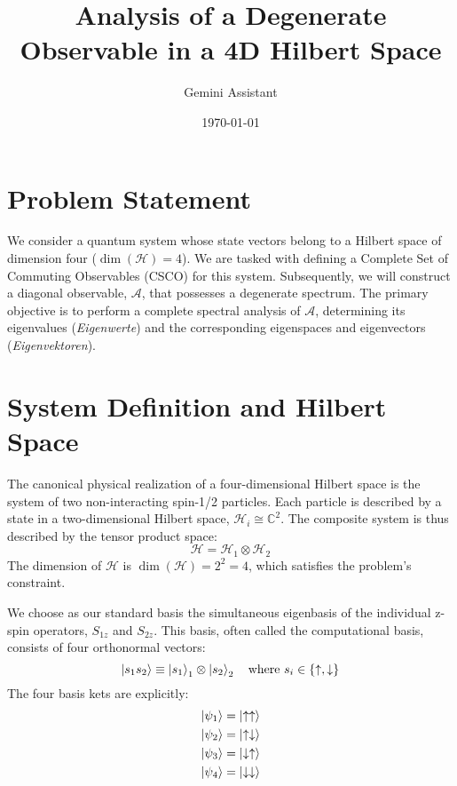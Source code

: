 \documentclass[11pt,a4paper]{article}
\title{Analysis of a Degenerate Observable in a 4D Hilbert Space}
\author{Gemini Assistant}
\date{\today}
\begin{document}
\maketitle

\section{Problem Statement}

We consider a quantum system whose state vectors belong to a Hilbert space of dimension four ($\dim(\mathcal{H})=4$). We are tasked with defining a Complete Set of Commuting Observables (CSCO) for this system. Subsequently, we will construct a diagonal observable, $\mathcal{A}$, that possesses a degenerate spectrum. The primary objective is to perform a complete spectral analysis of $\mathcal{A}$, determining its eigenvalues (\textit{Eigenwerte}) and the corresponding eigenspaces and eigenvectors (\textit{Eigenvektoren}).

\section{System Definition and Hilbert Space}

The canonical physical realization of a four-dimensional Hilbert space is the system of two non-interacting spin-1/2 particles. Each particle is described by a state in a two-dimensional Hilbert space, $\mathcal{H}_i \cong \mathbb{C}^2$. The composite system is thus described by the tensor product space:
\begin{equation}
    \mathcal{H} = \mathcal{H}_1 \otimes \mathcal{H}_2
\end{equation}
The dimension of $\mathcal{H}$ is $\dim(\mathcal{H}) = 2^2 = 4$, which satisfies the problem's constraint.

We choose as our standard basis the simultaneous eigenbasis of the individual z-spin operators, $S_{1z}$ and $S_{2z}$. This basis, often called the computational basis, consists of four orthonormal vectors:
\begin{equation}
    \ket{s_1 s_2} \equiv \ket{s_1}_1 \otimes \ket{s_2}_2 \quad \text{where } s_i \in \{\uparrow, \downarrow\}
\end{equation}
The four basis kets are explicitly:
\begin{align*}
    \ket{\psi_1} &= \ket{\uparrow\uparrow} \\
    \ket{\psi_2} &= \ket{\uparrow\downarrow} \\
    \ket{\psi_3} &= \ket{\downarrow\uparrow} \\
    \ket{\psi_4} &= \ket{\downarrow\downarrow}
\end{align*}
\end{document}
